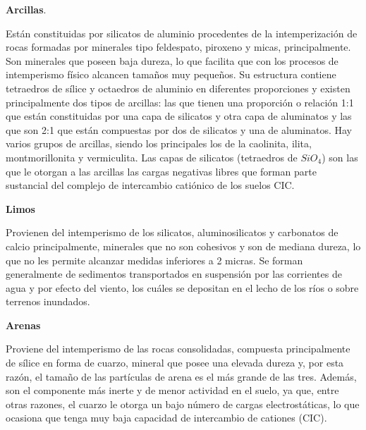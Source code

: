 \textbf{Arcillas}. 

Están constituidas por silicatos de aluminio procedentes de la intemperización de rocas formadas por minerales tipo feldespato, piroxeno y micas, principalmente. Son minerales que poseen baja dureza, lo que facilita que con los procesos de intemperismo físico alcancen tamaños muy pequeños. Su estructura contiene tetraedros de sílice y octaedros de aluminio en diferentes proporciones y existen principalmente dos tipos de arcillas: las que tienen una proporción o relación 1:1 que están constituidas por una capa de silicatos y otra capa de aluminatos y las que son 2:1 que están compuestas por dos de silicatos y una de aluminatos. Hay varios grupos de arcillas, siendo los principales los de la caolinita, ilita, montmorillonita y vermiculita. Las capas de silicatos (tetraedros de $SiO_4$) son las que le otorgan a las arcillas las cargas negativas libres que forman parte sustancial del complejo de intercambio catiónico de los suelos CIC.

\textbf{Limos}

Provienen del intemperismo de los silicatos, aluminosilicatos y carbonatos de calcio principalmente, minerales que no son cohesivos y son de mediana dureza, lo que no les permite alcanzar medidas inferiores a 2 micras. Se forman generalmente de sedimentos transportados en suspensión por las corrientes de agua y por efecto del viento, los cuáles se depositan en el lecho de los ríos o sobre terrenos inundados.

\textbf{Arenas}

Proviene del intemperismo de las rocas consolidadas, compuesta principalmente de sílice en forma de cuarzo, mineral que posee una elevada dureza y, por esta razón, el tamaño de las partículas de arena es el más grande de las tres. Además, son el componente más inerte y de menor actividad en el suelo, ya que, entre otras razones, el cuarzo le otorga un bajo número de cargas electrostáticas, lo que ocasiona que tenga muy baja capacidad de intercambio de cationes (CIC).


